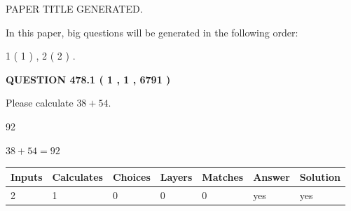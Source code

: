 \documentclass[12pt]{article}
\begin{document}
   
   
   
   
   
 \vspace{0.2in}
 
 
 
 
   
   
 PAPER TITLE GENERATED.
   
   
   
\vspace{0.2in}
   
In this paper, big questions will be generated in the following order: 
   
   
   1 ( 1 )
 ,
   2 ( 2 )
 .
  
\vspace{0.2in}
  
{\textbf{\Large{QUESTION
478.1 
 ( 1 , 1 , 6791 )
}}}
  
  
 
Please calculate $ %
38 +  %
54 $.
 
 
 
\noindent{}
 
 

92
 
 
\noindent{}
 
 

 
 
 
\noindent{}
 
 

$ %
38 +  %
54=   %
92$
 
 
\noindent{}
 
 

 
   
   
   
   
\noindent\begin{tabular}{|l|l|l|l|l|l|l|}
 \hline
Inputs & Calculates & Choices & Layers & Matches & Answer & Solution \\ \hline
 2  & 
 1  & 
 0
  & 
 0  & 
 0  & 
  yes & 
  yes 
  \\ \hline
 \end{tabular}
   
   
   
   
\noindent{}
   
\end{document}

